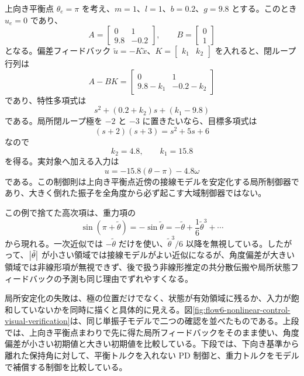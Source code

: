 \begin{example}[トルク入力をもつ単振子の局所線形化]
上向き平衡点 $\theta_e=\pi$ を考え、$m=1$、$l=1$、$b=0.2$、$g=9.8$ とする。このとき $u_e=0$ であり、
\begin{equation}
  A=
  \begin{bmatrix}
    0&1\\
    9.8&-0.2
  \end{bmatrix},
  \qquad
  B=
  \begin{bmatrix}
    0\\1
  \end{bmatrix}
\end{equation}
となる。偏差フィードバック $\tilde{u}=-K\tilde{x}$、$K=\begin{bmatrix}k_1&k_2\end{bmatrix}$ を入れると、閉ループ行列は
\begin{equation}
  A-BK=
  \begin{bmatrix}
    0&1\\
    9.8-k_1&-0.2-k_2
  \end{bmatrix}
\end{equation}
であり、特性多項式は
\begin{equation}
  s^2+(0.2+k_2)s+(k_1-9.8)
\end{equation}
である。局所閉ループ極を $-2$ と $-3$ に置きたいなら、目標多項式は
\begin{equation}
  (s+2)(s+3)=s^2+5s+6
\end{equation}
なので
\begin{equation}
  k_2=4.8,\qquad k_1=15.8
\end{equation}
を得る。実対象へ加える入力は
\begin{equation}
  u=-15.8(\theta-\pi)-4.8\omega
\end{equation}
である。この制御則は上向き平衡点近傍の接線モデルを安定化する局所制御器であり、大きく倒れた振子を全角度から必ず起こす大域制御器ではない。

この例で捨てた高次項は、重力項の
\begin{equation}
  \sin(\pi+\tilde{\theta})
  =-\sin\tilde{\theta}
  =-\tilde{\theta}+\frac{1}{6}\tilde{\theta}^3+\cdots
\end{equation}
から現れる。一次近似では $-\tilde{\theta}$ だけを使い、$\tilde{\theta}^3/6$ 以降を無視している。したがって、$\left|\tilde{\theta}\right|$ が小さい領域では接線モデルがよい近似になるが、角度偏差が大きい領域では非線形項が無視できず、後で扱う非線形推定の共分散伝搬や局所状態フィードバックの予測も同じ理由でずれやすくなる。
\end{example}

局所安定化の失敗は、極の位置だけでなく、状態が有効領域に残るか、入力が飽和していないかを同時に描くと具体的に見える。図\ref{fig:flow6-nonlinear-control-visual-verification}は、同じ単振子モデルで二つの確認を並べたものである。上段では、上向き平衡点まわりで先に得た局所フィードバックをそのまま使い、角度偏差が小さい初期値と大きい初期値を比較している。下段では、下向き基準から離れた保持角に対して、平衡トルクを入れない PD 制御と、重力トルクをモデルで補償する制御を比較している。


